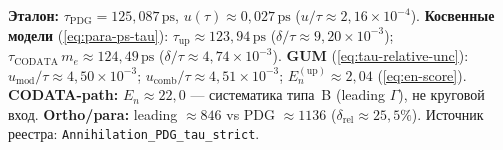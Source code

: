 \textbf{Эталон:} $\tau_{\mathrm{PDG}}=125{,}087\,\mathrm{ps}$,
$u(\tau)\approx 0{,}027\,\mathrm{ps}$ ($u/\tau\approx 2{,}16\times 10^{-4}$).
\textbf{Косвенные модели} (\eqref{eq:para-ps-tau}):
$\tau_{\mathrm{up}}\approx 123{,}94\,\mathrm{ps}$ ($\delta/\tau\approx 9{,}20\times 10^{-3}$);
$\tau_{\mathrm{CODATA}}\,m_e\approx 124{,}49\,\mathrm{ps}$ ($\delta/\tau\approx 4{,}74\times 10^{-3}$).
\textbf{GUM} (\eqref{eq:tau-relative-unc}):
$u_{\mathrm{mod}}/\tau\approx 4{,}50\times 10^{-3}$;
$u_{\mathrm{comb}}/\tau\approx 4{,}51\times 10^{-3}$;
$E_n^{(\mathrm{up})}\approx 2{,}04$ (\eqref{eq:en-score}).
\textbf{CODATA-path:} $E_n\approx 22{,}0$ --- систематика типа~B (leading $\Gamma$), не круговой вход.
\textbf{Ortho/para:} leading $\approx 846$ vs PDG $\approx 1136$
($\delta_{\mathrm{rel}}\approx 25{,}5\%$).
Источник реестра: \texttt{Annihilation\_PDG\_tau\_strict}.
